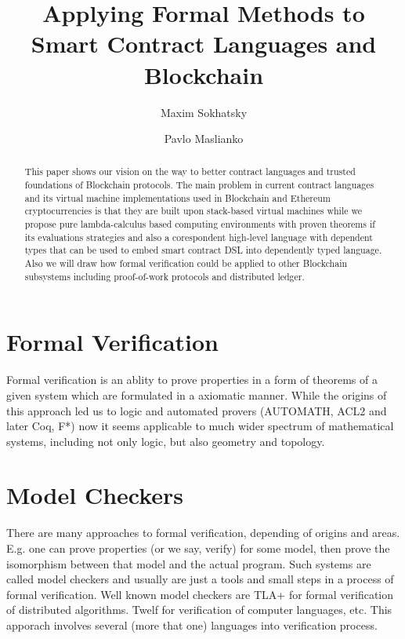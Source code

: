 \documentclass{svproc}
\begin{document}
\mainmatter
\title{Applying Formal Methods to Smart Contract Languages and Blockchain}
\author{Maxim Sokhatsky \and Pavlo Maslianko}
\maketitle
\begin{abstract}
This paper shows our vision on the way to better contract languages and
trusted foundations of Blockchain protocols. The main problem in current
contract languages and its virtual machine implementations used in
Blockchain and Ethereum cryptocurrencies is that they are built upon stack-based
virtual machines while we propose pure lambda-calculus based computing
environments with proven theorems if its evaluations strategies and also a
corespondent high-level language with dependent types that
can be used to embed smart contract DSL into dependently typed language.
Also we will draw how formal verification could be applied to other
Blockchain subsystems including proof-of-work protocols and distributed ledger.
\end{abstract}

\section{Formal Verification}
Formal verification is an ablity to prove properties in a form of theorems
of a given system which are formulated in a axiomatic manner.
While the origins of this approach led us to logic and automated
provers (AUTOMATH, ACL2 and later Coq, F*) now it seems applicable
to much wider spectrum of mathematical systems, including not only logic,
but also geometry and topology.

\section{Model Checkers}
There are many approaches to formal verification, depending of
origins and areas. E.g. one can prove properties (or we say, verify) for some model,
then prove the isomorphism between that model and the actual program. Such systems
are called model checkers and usually are just a tools and small steps in a process
of formal verification. Well known model checkers are TLA+ for formal
verification of distributed algorithms. Twelf for verification of computer languages, etc.
This apporach involves several (more that one) languages into verification process.
\end{document}
